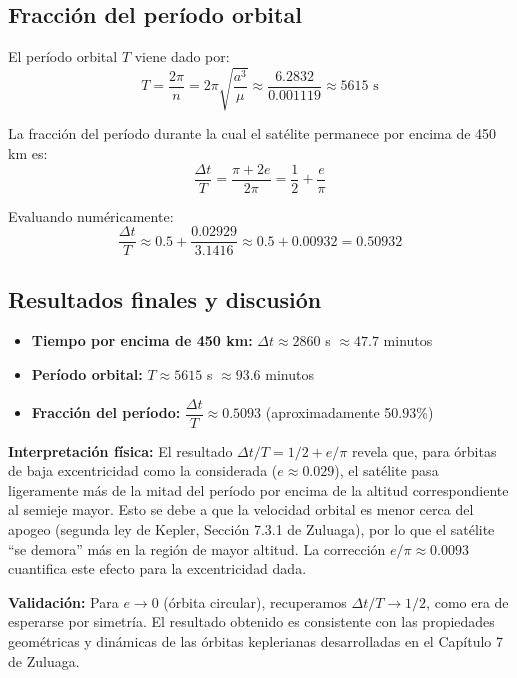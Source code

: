 \documentclass[12pt, a4paper]{article}
\begin{document}
\subsection*{Fracción del período orbital}

El período orbital $T$ viene dado por:
\begin{equation}
    T = \frac{2\pi}{n} = 2\pi\sqrt{\frac{a^3}{\mu}} \approx \frac{6.2832}{0.001119} \approx 5615 \text{ s}
\end{equation}

La fracción del período durante la cual el satélite permanece por encima de 450 km es:
\begin{equation}
    \frac{\Delta t}{T} = \frac{\pi + 2e}{2\pi} = \frac{1}{2} + \frac{e}{\pi}
\end{equation}

Evaluando numéricamente:
\begin{equation}
    \frac{\Delta t}{T} \approx 0.5 + \frac{0.02929}{3.1416} \approx 0.5 + 0.00932 = 0.50932
\end{equation}

\subsection*{Resultados finales y discusión}

\begin{itemize}
    \item \textbf{Tiempo por encima de 450 km:} $\Delta t \approx 2860$ s $\approx 47.7$ minutos
    \item \textbf{Período orbital:} $T \approx 5615$ s $\approx 93.6$ minutos
    \item \textbf{Fracción del período:} $\dfrac{\Delta t}{T} \approx 0.5093$ (aproximadamente 50.93\%)
\end{itemize}

\textbf{Interpretación física:} El resultado $\Delta t/T = 1/2 + e/\pi$ revela que, para órbitas de baja excentricidad como la considerada ($e \approx 0.029$), el satélite pasa ligeramente más de la mitad del período por encima de la altitud correspondiente al semieje mayor. Esto se debe a que la velocidad orbital es menor cerca del apogeo (segunda ley de Kepler, Sección 7.3.1 de Zuluaga), por lo que el satélite ``se demora'' más en la región de mayor altitud. La corrección $e/\pi \approx 0.0093$ cuantifica este efecto para la excentricidad dada.

\textbf{Validación:} Para $e \to 0$ (órbita circular), recuperamos $\Delta t/T \to 1/2$, como era de esperarse por simetría. El resultado obtenido es consistente con las propiedades geométricas y dinámicas de las órbitas keplerianas desarrolladas en el Capítulo 7 de Zuluaga.
\end{document}
